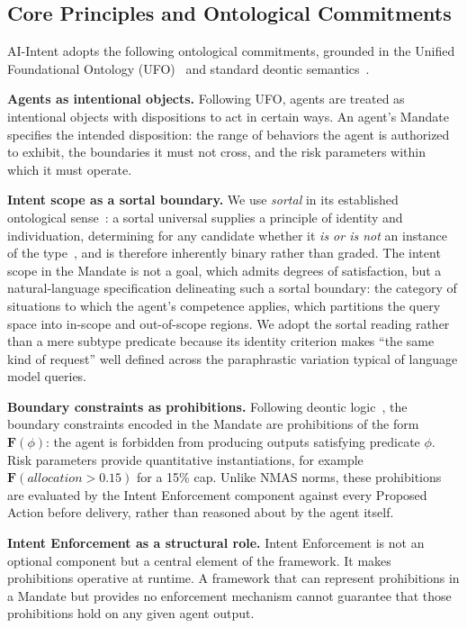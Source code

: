\documentclass[runningheads]{llncs}
\begin{document}
\subsection{Core Principles and Ontological Commitments}
\label{sec:ontology}

AI-Intent adopts the following ontological commitments, grounded in the
Unified Foundational Ontology (UFO)~\cite{guizzardi2005ontological} and
standard deontic
semantics~\cite{vonwright1951essay,governatori2005meeting}.

\textbf{Agents as intentional objects.} Following UFO, agents are
treated as intentional objects with dispositions to act in certain ways.
An agent's Mandate specifies the intended disposition: the range of
behaviors the agent is authorized to exhibit, the boundaries it must not
cross, and the risk parameters within which it must operate.

\textbf{Intent scope as a sortal boundary.} We use \emph{sortal} in its
established ontological sense~\cite{gupta1980common}: a sortal universal
supplies a principle of identity and individuation, determining for any
candidate whether it \emph{is or is not} an instance of the
type~\cite{guizzardi2005ontological}, and is therefore inherently binary
rather than graded. The intent scope
in the Mandate is not a goal, which admits degrees of satisfaction, but a
natural-language specification delineating such a sortal boundary: the
category of situations to which the agent's competence applies, which
partitions the query space into in-scope and out-of-scope regions. We
adopt the sortal reading rather than a mere subtype predicate because its
identity criterion makes ``the same kind of request'' well defined across
the paraphrastic variation typical of language model queries.

\textbf{Boundary constraints as prohibitions.} Following deontic
logic~\cite{vonwright1951essay}, the boundary constraints encoded in the
Mandate are prohibitions of the form $\mathbf{F}(\phi)$: the agent is
forbidden from producing outputs satisfying predicate $\phi$. Risk
parameters provide quantitative instantiations, for example
$\mathbf{F}(\mathit{allocation} > 0.15)$ for a 15\% cap. Unlike NMAS
norms, these prohibitions are evaluated by the Intent Enforcement
component against every Proposed Action before delivery, rather than
reasoned about by the agent itself.

\textbf{Intent Enforcement as a structural role.} Intent Enforcement is
not an optional component but a central element of the framework. It
makes prohibitions operative at runtime. A framework that can represent
prohibitions in a Mandate but provides no enforcement mechanism cannot
guarantee that those prohibitions hold on any given agent output.
\end{document}
